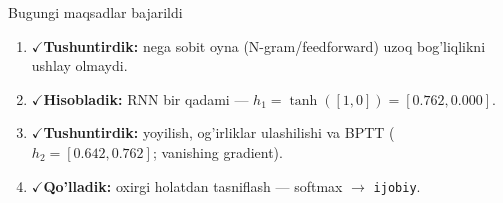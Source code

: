 \documentclass[aspectratio=169,11pt]{beamer}
\newcommand{\bajarildi}{{\color{deepgreen}\large$\checkmark$}\;}
\begin{document}
\begin{frame}{Bugungi maqsadlar bajarildi}
  \begin{enumerate}\setlength\itemsep{7pt}
    \item \bajarildi \textbf{Tushuntirdik:} nega sobit oyna (N-gram/feedforward)
          uzoq bog'liqlikni ushlay olmaydi.
    \item \bajarildi \textbf{Hisobladik:} RNN bir qadami ---
          $h_1=\tanh([1,0])=[0.762,0.000]$.
    \item \bajarildi \textbf{Tushuntirdik:} yoyilish, og'irliklar ulashilishi va
          BPTT ($h_2=[0.642,0.762]$; vanishing gradient).
    \item \bajarildi \textbf{Qo'lladik:} oxirgi holatdan tasniflash ---
          softmax $\to$ \texttt{ijobiy}.
  \end{enumerate}
\end{frame}
\end{document}
